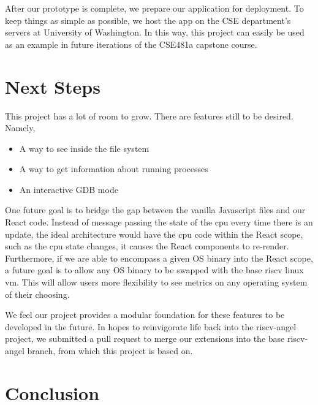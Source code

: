 After our prototype is complete, we prepare our application for deployment.
To keep things as simple as possible, we host the app on the
CSE department's servers at University of Washington. In this way, this project
can easily be used as an example in future iterations of the CSE481a capstone course.


\section*{Next Steps}

This project has a lot of room to grow. There are features still to be desired. Namely,

\begin{itemize}
  \item A way to see inside the file system
  \item A way to get information about running processes
  \item An interactive GDB mode
\end{itemize}

One future goal is to bridge the gap between the vanilla Javascript files and our React code.
Instead of message passing the state of the cpu every time there is an update, the ideal architecture
would have the cpu code within the React scope, such as the cpu state changes, it causes
the React components to re-render. Furthermore, if we are able to encompass a given OS binary
into the React scope, a future goal is to allow any OS binary to be swapped with the base
riscv linux vm. This will allow users more flexibility to see metrics on any operating system
of their choosing.

We feel our project provides a modular foundation for these features to be developed in the future.
In hopes to reinvigorate life back into the riscv-angel project, we submitted a pull request
to merge our extensions into the base riscv-angel branch, from which this project is based on.



\section*{Conclusion}

